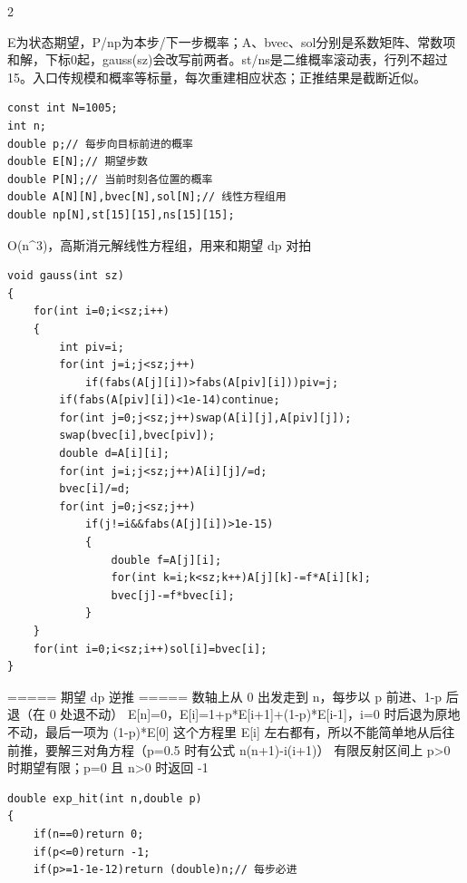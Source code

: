 \documentclass[UTF8,fontset=fandol,a4paper,twoside]{ctexart}
\newcommand{\note}[1]{{\fontsize{10}{12}\selectfont #1\par}}
\begin{document}
\begin{multicols}{2}
\note{E为状态期望，P/\allowbreak{}np为本步/\allowbreak{}下一步概率；A、bvec、sol分别是系数矩阵、常数项和解，下标0起，gauss(\allowbreak{}sz)\allowbreak{}会改写前两者。st/\allowbreak{}ns是二维概率滚动表，行列不超过15。入口传规模和概率等标量，每次重建相应状态；正推结果是截断近似。}
\begin{lstlisting}
const int N=1005;
int n;
double p;// 每步向目标前进的概率
double E[N];// 期望步数
double P[N];// 当前时刻各位置的概率
double A[N][N],bvec[N],sol[N];// 线性方程组用
double np[N],st[15][15],ns[15][15];
\end{lstlisting}
\note{O(\allowbreak{}n\textasciicircum{}3)\allowbreak{}，高斯消元解线性方程组，用来和期望 dp 对拍}
\begin{lstlisting}
void gauss(int sz)
{
    for(int i=0;i<sz;i++)
    {
        int piv=i;
        for(int j=i;j<sz;j++)
            if(fabs(A[j][i])>fabs(A[piv][i]))piv=j;
        if(fabs(A[piv][i])<1e-14)continue;
        for(int j=0;j<sz;j++)swap(A[i][j],A[piv][j]);
        swap(bvec[i],bvec[piv]);
        double d=A[i][i];
        for(int j=i;j<sz;j++)A[i][j]/=d;
        bvec[i]/=d;
        for(int j=0;j<sz;j++)
            if(j!=i&&fabs(A[j][i])>1e-15)
            {
                double f=A[j][i];
                for(int k=i;k<sz;k++)A[j][k]-=f*A[i][k];
                bvec[j]-=f*bvec[i];
            }
    }
    for(int i=0;i<sz;i++)sol[i]=bvec[i];
}
\end{lstlisting}
\note{=\allowbreak{}=\allowbreak{}=\allowbreak{}=\allowbreak{}=\allowbreak{} 期望 dp 逆推 =\allowbreak{}=\allowbreak{}=\allowbreak{}=\allowbreak{}=\allowbreak{} 数轴上从 0 出发走到 n，每步以 p 前进、1-\allowbreak{}p 后退（在 0 处退不动） E[\allowbreak{}n]\allowbreak{}=\allowbreak{}0，E[\allowbreak{}i]\allowbreak{}=\allowbreak{}1+\allowbreak{}p*E[\allowbreak{}i+\allowbreak{}1]\allowbreak{}+\allowbreak{}(\allowbreak{}1-\allowbreak{}p)\allowbreak{}*E[\allowbreak{}i-\allowbreak{}1]\allowbreak{}，i=\allowbreak{}0 时后退为原地不动，最后一项为 (\allowbreak{}1-\allowbreak{}p)\allowbreak{}*E[\allowbreak{}0]\allowbreak{} 这个方程里 E[\allowbreak{}i]\allowbreak{} 左右都有，所以不能简单地从后往前推，要解三对角方程（p=\allowbreak{}0.\allowbreak{}5 时有公式 n(\allowbreak{}n+\allowbreak{}1)\allowbreak{}-\allowbreak{}i(\allowbreak{}i+\allowbreak{}1)\allowbreak{}） 有限反射区间上 p>\allowbreak{}0 时期望有限；p=\allowbreak{}0 且 n>\allowbreak{}0 时返回 -\allowbreak{}1}
\begin{lstlisting}
double exp_hit(int n,double p)
{
    if(n==0)return 0;
    if(p<=0)return -1;
    if(p>=1-1e-12)return (double)n;// 每步必进

\end{lstlisting}
\end{multicols}
\end{document}
